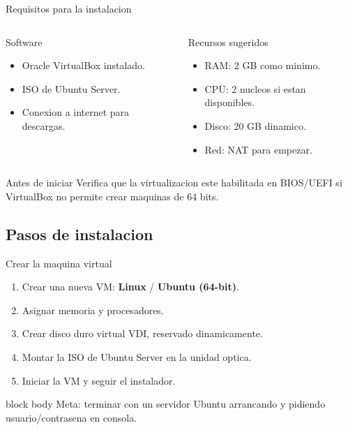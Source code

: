 \documentclass[aspectratio=169]{beamer}
\begin{document}
\begin{frame}{Requisitos para la instalacion}
  \small
  \begin{columns}[t]
    \begin{block}{Software}
      \begin{itemize}
        \item Oracle VirtualBox instalado.
        \item ISO de Ubuntu Server.
        \item Conexion a internet para descargas.
      \end{itemize}
    \end{block}
    \begin{block}{Recursos sugeridos}
      \begin{itemize}
        \item RAM: 2 GB como minimo.
        \item CPU: 2 nucleos si estan disponibles.
        \item Disco: 20 GB dinamico.
        \item Red: NAT para empezar.
      \end{itemize}
    \end{block}
  \end{columns}
  \vfill
  \begin{alertblock}{Antes de iniciar}
    \small Verifica que la virtualizacion este habilitada en BIOS/UEFI si VirtualBox no permite crear maquinas de 64 bits.
  \end{alertblock}
\end{frame}

\subsection{Pasos de instalacion}
\begin{frame}{Crear la maquina virtual}
  \begin{enumerate}
    \item Crear una nueva VM: \textbf{Linux} / \textbf{Ubuntu (64-bit)}.
    \item Asignar memoria y procesadores.
    \item Crear disco duro virtual VDI, reservado dinamicamente.
    \item Montar la ISO de Ubuntu Server en la unidad optica.
    \item Iniciar la VM y seguir el instalador.
  \end{enumerate}
  \vfill
  \begin{beamercolorbox}[rounded=true, shadow=false, sep=4pt, center]{block body}
    \small Meta: terminar con un servidor Ubuntu arrancando y pidiendo usuario/contrasena en consola.
  \end{beamercolorbox}
\end{frame}
\end{document}
